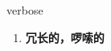 
\begin{frame}
{\huge verbose}
\begin{center}
\begin{enumerate}\Large
  \item \textbf{冗长的，啰嗦的}
\end{enumerate}
\end{center}
\end{frame}
